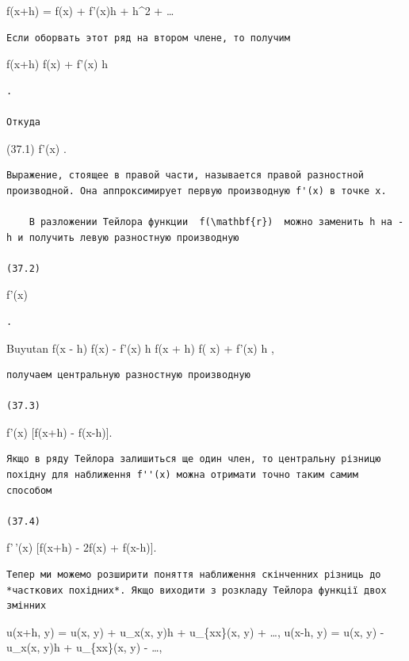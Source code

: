 \documentclass[
  ukrainian,
]{article}
\begin{document}
f(x+h) = f(x) + f'(x)h + h\^{}2 + \dots

\begin{verbatim}
Если оборвать этот ряд на втором члене, то получим
\end{verbatim}

f(x+h) \cong f(x) + f'(x) h

\begin{verbatim}
.

Откуда
\end{verbatim}

(37.1) f'(x) \cong {}.

\begin{verbatim}
Выражение, стоящее в правой части, называется правой разностной производной. Она аппроксимирует первую производную f'(x) в точке x.

    В разложении Тейлора функции  f(\mathbf{r})  можно заменить h на -h и получить левую разностную производную

(37.2)
\end{verbatim}

f'(x) \cong {}

\begin{verbatim}
.
\end{verbatim}

Buyutan f(x - h) \cong f(x) - f'(x) h \nif  f(x + h) \cong f( x) + f'(x)
h ,

\begin{verbatim}
получаем центральную разностную производную

(37.3)
\end{verbatim}

f'(x) \simeq {} {[}f(x+h) - f(x-h){]}.

\begin{verbatim}
Якщо в ряду Тейлора залишиться ще один член, то центральну різницю похідну для наближення f''(x) можна отримати точно таким самим способом

(37.4)
\end{verbatim}

f'\,'(x) \cong {} {[}f(x+h) - 2f(x) + f(x-h){]}.

\begin{verbatim}
Тепер ми можемо розширити поняття наближення скінченних різниць до *часткових похідних*. Якщо виходити з розкладу Тейлора функції двох змінних
\end{verbatim}

u(x+h, y) = u(x, y) + u\_x(x, y)h + u\_\{xx\}(x, y) +
\dots, u(x-h, y) = u(x, y) - u\_x(x, y)h + u\_\{xx\}(x, y)
- \dots,
\end{document}
